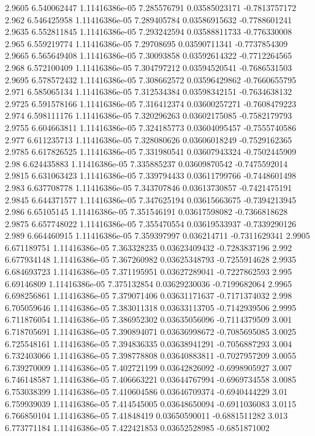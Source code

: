 {2.9605 6.540062447 1.11416386e-05 7.285576791 0.03585023171 -0.7813757172
2.962 6.546425958 1.11416386e-05 7.289405784 0.03586915632 -0.7788601241
2.9635 6.552811845 1.11416386e-05 7.293242594 0.03588811733 -0.776330008
2.965 6.559219774 1.11416386e-05 7.29708695 0.03590711341 -0.7737854309
2.9665 6.565649408 1.11416386e-05 7.30093858 0.03592614322 -0.7712264565
2.968 6.572100409 1.11416386e-05 7.304797212 0.03594520541 -0.7686531503
2.9695 6.578572432 1.11416386e-05 7.308662572 0.03596429862 -0.7660655795
2.971 6.585065134 1.11416386e-05 7.312534384 0.03598342151 -0.7634638132
2.9725 6.591578166 1.11416386e-05 7.316412374 0.03600257271 -0.7608479223
2.974 6.598111176 1.11416386e-05 7.320296263 0.03602175085 -0.7582179793
2.9755 6.604663811 1.11416386e-05 7.324185773 0.03604095457 -0.7555740586
2.977 6.611235713 1.11416386e-05 7.328080626 0.03606018249 -0.7529162365
2.9785 6.617826525 1.11416386e-05 7.331980541 0.03607943324 -0.7502445909
2.98 6.624435883 1.11416386e-05 7.335885237 0.03609870542 -0.7475592014
2.9815 6.631063423 1.11416386e-05 7.339794433 0.03611799766 -0.7448601498
2.983 6.637708778 1.11416386e-05 7.343707846 0.03613730857 -0.7421475191
2.9845 6.644371577 1.11416386e-05 7.347625194 0.03615663675 -0.7394213945
2.986 6.65105145 1.11416386e-05 7.351546191 0.03617598082 -0.7366818628
2.9875 6.657748022 1.11416386e-05 7.355470554 0.03619533937 -0.7339290126
2.989 6.664460915 1.11416386e-05 7.359397997 0.036214711 -0.7311629341
2.9905 6.671189751 1.11416386e-05 7.363328235 0.03623409432 -0.7283837196
2.992 6.677934148 1.11416386e-05 7.367260982 0.03625348793 -0.7255914628
2.9935 6.684693723 1.11416386e-05 7.371195951 0.03627289041 -0.7227862593
2.995 6.69146809 1.11416386e-05 7.375132854 0.03629230036 -0.7199682064
2.9965 6.698256861 1.11416386e-05 7.379071406 0.03631171637 -0.7171374032
2.998 6.705059646 1.11416386e-05 7.383011318 0.03633113705 -0.7142939506
2.9995 6.711876054 1.11416386e-05 7.386952302 0.03635056096 -0.7114379509
3.001 6.718705691 1.11416386e-05 7.390894071 0.03636998672 -0.7085695085
3.0025 6.725548161 1.11416386e-05 7.394836335 0.03638941291 -0.7056887293
3.004 6.732403066 1.11416386e-05 7.398778808 0.03640883811 -0.7027957209
3.0055 6.739270009 1.11416386e-05 7.402721199 0.03642826092 -0.6998905927
3.007 6.746148587 1.11416386e-05 7.406663221 0.03644767994 -0.6969734558
3.0085 6.753038399 1.11416386e-05 7.410604586 0.03646709374 -0.6940444229
3.01 6.759939039 1.11416386e-05 7.414545005 0.03648650094 -0.6911036083
3.0115 6.766850104 1.11416386e-05 7.41848419 0.03650590011 -0.6881511282
3.013 6.773771184 1.11416386e-05 7.422421853 0.03652528985 -0.6851871002
}
